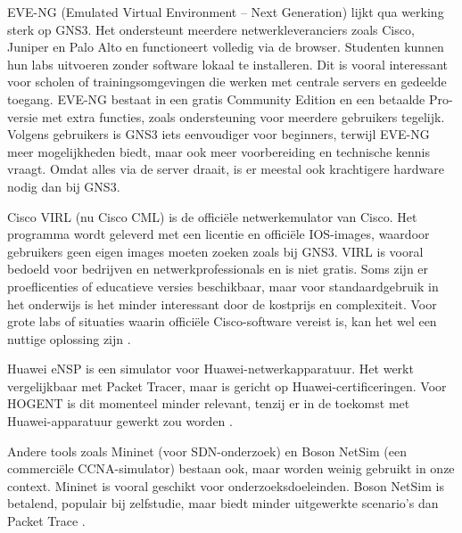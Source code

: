 \vspace{0.3cm}

EVE-NG (Emulated Virtual Environment – Next Generation) lijkt qua werking sterk op GNS3. Het ondersteunt meerdere netwerkleveranciers zoals Cisco, Juniper en Palo Alto en functioneert volledig via de browser. Studenten kunnen hun labs uitvoeren zonder software lokaal te installeren. Dit is vooral interessant voor scholen of trainingsomgevingen die werken met centrale servers en gedeelde toegang. EVE-NG bestaat in een gratis Community Edition en een betaalde Pro-versie met extra functies, zoals ondersteuning voor meerdere gebruikers tegelijk. Volgens gebruikers is GNS3 iets eenvoudiger voor beginners, terwijl EVE-NG meer mogelijkheden biedt, maar ook meer voorbereiding en technische kennis vraagt. Omdat alles via de server draait, is er meestal ook krachtigere hardware nodig dan bij GNS3\autocite{eve-ng}.

\vspace{0.3cm}

Cisco VIRL (nu Cisco CML) is de officiële netwerkemulator van Cisco. Het programma wordt geleverd met een licentie en officiële IOS-images, waardoor gebruikers geen eigen images moeten zoeken zoals bij GNS3. VIRL is vooral bedoeld voor bedrijven en netwerkprofessionals en is niet gratis. Soms zijn er proeflicenties of educatieve versies beschikbaar, maar voor standaardgebruik in het onderwijs is het minder interessant door de kostprijs en complexiteit. Voor grote labs of situaties waarin officiële Cisco-software vereist is, kan het wel een nuttige oplossing zijn \autocite{cisco-cml}.

\vspace{0.3cm}

Huawei eNSP is een simulator voor Huawei-netwerkapparatuur. Het werkt vergelijkbaar met Packet Tracer, maar is gericht op Huawei-certificeringen. Voor HOGENT is dit momenteel minder relevant, tenzij er in de toekomst met Huawei-apparatuur gewerkt zou worden \autocite{huawei-ensp}.

\vspace{0.3cm}

Andere tools zoals Mininet (voor SDN-onderzoek) en Boson NetSim (een commerciële CCNA-simulator) bestaan ook, maar worden weinig gebruikt in onze context. Mininet is vooral geschikt voor onderzoeksdoeleinden. Boson NetSim is betalend, populair bij zelfstudie, maar biedt minder uitgewerkte scenario’s dan Packet Trace \autocite{huawei-ensp, cisco-cml}.


